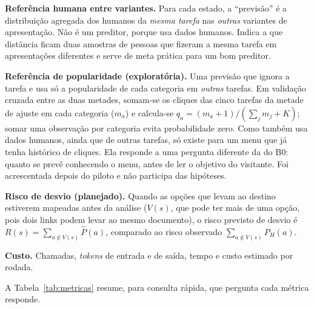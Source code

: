 \documentclass[12pt,oneside,a4paper,chapter=TITLE,english,brazil]{abntex2}
\newcommand{\Ph}{P_H}
\newcommand{\Pp}{\hat{P}}
\begin{document}
\textbf{Referência humana entre variantes.} Para cada estado, a ``previsão'' é a distribuição agregada dos humanos da \emph{mesma tarefa} nas \emph{outras} variantes de apresentação. Não é um preditor, porque usa dados humanos. Indica a que distância ficam duas amostras de pessoas que fizeram a mesma tarefa em apresentações diferentes e serve de meta prática para um bom preditor.

\textbf{Referência de popularidade (exploratória).} Uma previsão que ignora a tarefa e usa só a popularidade de cada categoria em \emph{outras} tarefas. Em validação cruzada entre as duas metades, somam-se os cliques das cinco tarefas da metade de ajuste em cada categoria ($m_a$) e calcula-se $q_a=(m_a+1)/(\sum_j m_j+K)$; somar uma observação por categoria evita probabilidade zero. Como também usa dados humanos, ainda que de outras tarefas, só existe para um menu que já tenha histórico de cliques. Ela responde a uma pergunta diferente da do B0: quanto se prevê conhecendo o menu, antes de ler o objetivo do visitante. Foi acrescentada depois do piloto e não participa das hipóteses.

\textbf{Risco de desvio (planejado).} Quando as opções que levam ao destino estiverem mapeadas antes da análise ($V(s)$, que pode ter mais de uma opção, pois dois links podem levar ao mesmo documento), o risco previsto de desvio é $R(s)=\sum_{a\notin V(s)} \Pp(a)$, comparado ao risco observado $\sum_{a\notin V(s)} \Ph(a)$.

\textbf{Custo.} Chamadas, \textit{tokens} de entrada e de saída, tempo e custo estimado por rodada.

A Tabela~\ref{tab:metricas} resume, para consulta rápida, que pergunta cada métrica responde.
\end{document}
